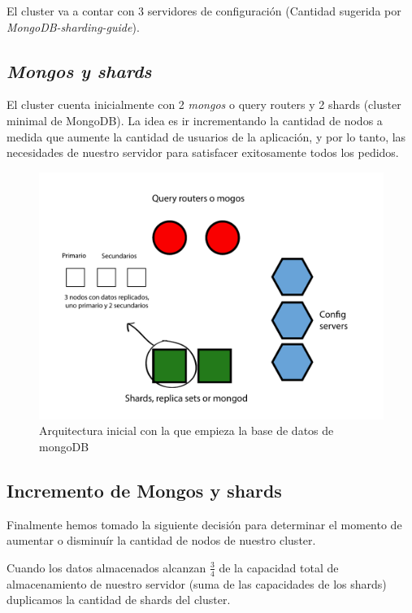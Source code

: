 El cluster va a contar con 3 servidores de configuración (Cantidad sugerida por \emph{MongoDB-sharding-guide}).

\subsection{\emph{Mongos y shards}}

El cluster cuenta inicialmente con 2 \emph{mongos} o query routers y 2 shards (cluster minimal de MongoDB). La idea es
ir incrementando la cantidad de nodos a medida que aumente la cantidad de usuarios de
la aplicación, y por lo tanto, las necesidades de nuestro servidor para satisfacer exitosamente todos los pedidos.

\begin{figure}[!h]
	\begin{center}
		  \includegraphics[scale=0.6]{imagenes/im_3.pdf}
		  \caption{Arquitectura inicial con la que empieza la base de datos de mongoDB}
		  \label{fig:contra1}
	\end{center}
\end{figure}
\FloatBarrier

\subsection{Incremento de Mongos y shards}

Finalmente hemos tomado la siguiente decisión para determinar el momento de aumentar o disminuír la cantidad de nodos
de nuestro cluster.

Cuando los datos almacenados alcanzan $\frac{3}{4}$ de 
la capacidad total de almacenamiento de nuestro servidor (suma de las capacidades de los shards) 
duplicamos la cantidad de shards del cluster.

